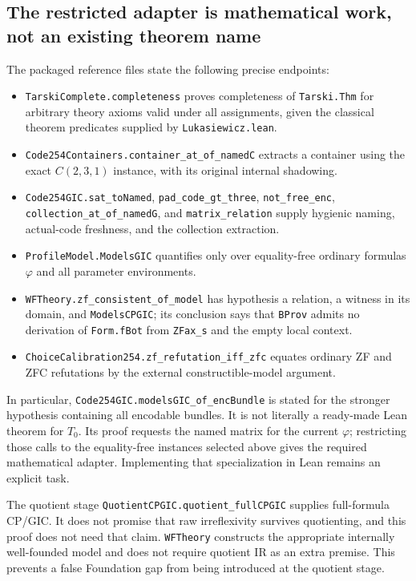 \documentclass[11pt,letterpaper]{article}
\theoremstyle{definition}\newtheorem{definition}[theorem]{Definition}
\theoremstyle{remark}\newtheorem{remark}[theorem]{Remark}
\newcommand{\file}[1]{\begingroup\small\ttfamily\nolinkurl{#1}\endgroup}
\begin{document}
\subsection{The restricted adapter is mathematical work, not an existing theorem name}
The packaged reference files state the following precise endpoints:
\begin{itemize}
\item \file{TarskiComplete.completeness} proves completeness of \file{Tarski.Thm} for arbitrary theory axioms valid under all assignments, given the classical theorem predicates supplied by \file{Lukasiewicz.lean}.
\item \file{Code254Containers.container_at_of_namedC} extracts a container using the exact $C(2,3,1)$ instance, with its original internal shadowing.
\item \file{Code254GIC.sat_toNamed}, \file{pad_code_gt_three}, \file{not_free_enc}, \file{collection_at_of_namedG}, and \file{matrix_relation} supply hygienic naming, actual-code freshness, and the collection extraction.
\item \file{ProfileModel.ModelsGIC} quantifies only over equality-free ordinary formulas $\varphi$ and all parameter environments.
\item \file{WFTheory.zf_consistent_of_model} has hypothesis a relation, a witness in its domain, and \file{ModelsCPGIC}; its conclusion says that \file{BProv} admits no derivation of \file{Form.fBot} from \file{ZFax_s} and the empty local context.
\item \file{ChoiceCalibration254.zf_refutation_iff_zfc} equates ordinary ZF and ZFC refutations by the external constructible-model argument.
\end{itemize}
In particular, \file{Code254GIC.modelsGIC_of_encBundle} is stated for the stronger hypothesis containing all encodable bundles. It is not literally a ready-made Lean theorem for $T_0$. Its proof requests the named matrix for the current $\varphi$; restricting those calls to the equality-free instances selected above gives the required mathematical adapter. Implementing that specialization in Lean remains an explicit task.

The quotient stage \file{QuotientCPGIC.quotient_fullCPGIC} supplies full-formula CP/GIC. It does not promise that raw irreflexivity survives quotienting, and this proof does not need that claim. \file{WFTheory} constructs the appropriate internally well-founded model and does not require quotient IR as an extra premise. This prevents a false Foundation gap from being introduced at the quotient stage.
\end{document}

